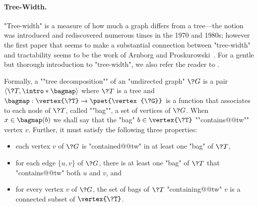 \paragraph*{Tree-Width.}
\AP "Tree-width" is a measure of how much a
graph differs from a tree---the notion was introduced and rediscovered
numerous times in the 1970 and 1980s; however the first paper
that seems to make a substantial connection between "tree-width" and tractability
seems to be the work of Arnborg and Proskurowski~\cite{ArnborgProskurowski1989LinearTreewidth}.
For a gentle but thorough introduction to "tree-width", we also refer the reader to
\cite[\S~3.6]{NesetrilPOM2012Prolegomena}.

Formally, a \AP""tree decomposition"" of an "undirected graph" $\?G$ is a
pair $\tup{\?T, \intro*\bagmap}$ where $\?T$ is a tree and $\bagmap: \vertex{\?T} \to \pset{\vertex{\?G}}$ is a function that associates to each node of $\?T$, called \AP""bag"",
a set of vertices of $\?G$. When $x \in \bagmap(b)$ we shall say that the "bag"
$b \in \vertex{\?T}$ \AP""contains@@tw"" vertex $v$. Further, it must satisfy the following three properties:
\begin{itemize}
    \item each vertex $v$ of $\?G$ is "contained@@tw" in at least one "bag" of $\?T$,
    \item for each edge $\{u,v\}$ of $\?G$, there is at least one "bag" of $\?T$
        that "contains@@tw" both $u$ and $v$, and 
    \item for every vertex $v$ of $\?G$, the set of bags of $\?T$ "containing@@tw" $v$ is a 
        connected subset of $\vertex{\?T}$.
\end{itemize}

